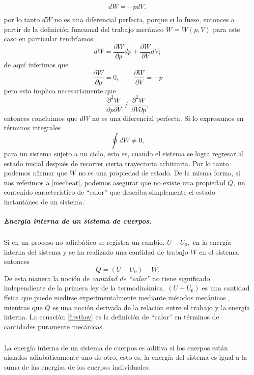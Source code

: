 \documentclass{article}
\theoremstyle{definition} \newtheorem{defi}{Definici\'on}
\theoremstyle{definition} \newtheorem{teo}{Teorema}
\theoremstyle{definition} \newtheorem{cor}{Corolario}
\begin{document}
\begin{align}
dW=-pdV,\\
\end{align}
por lo tanto $dW$ no es una diferencial perfecta, porque si lo fuese, entonces a partir de la definici\'on funcional del trabajo mec\'anico $W=W(p,V)$ para este caso en particular tendr\'iamos
\begin{equation}
dW = \frac{\partial W}{\partial p}dp + \frac{\partial W}{\partial V}dV;
\end{equation}
de aqu\'i inferimos que
\begin{equation}
\frac{\partial W}{\partial p}=0, \qquad \frac{\partial W}{\partial V} = -p
\end{equation}
pero esto implica necesariamente que
\begin{equation}
\frac{\partial^2 W}{\partial p\partial V}\neq\frac{\partial^2 W}{\partial V\partial p},
\end{equation}
entonces concluimos que $dW$ no es una diferencial perfecta. Si lo expresamos en t\'erminos integrales 
$$\oint dW \neq 0,$$
para un sistema sujeto a un ciclo, esto es, cuando el sistema se logra regresar al estado inicial despu\'es de recorrer cierta trayectoria arbitraria. Por lo tanto podemos afirmar que $W$ no es una propiedad de estado. De la misma forma, si nos referimos a \eqref{mecheat}, podemos asegurar que no existe una propiedad $Q$, un contenido caracter\'istico de ``calor'' que describa simplemente el estado instant\'aneo de un sistema.
\subparagraph{Energ\'ia interna de un sistema de cuerpos.}
Si en un proceso no adiab\'atico se registra un cambio, $U-U_0,$ en la energ\'ia interna del sistema y se ha realizado una cantidad de trabajo $W$ en el sistema, entonces 
\begin{equation}\label{firstlaw}
Q=(U-U_0)-W.
\end{equation}
De esta manera la noci\'on de \emph{cantidad de ``calor''} no tiene significado independiente de la primera ley de la termodin\'amica. $(U-U_0)$ es una cantidad f\'isica que puede medirse experimentalmente mediante m\'etodos mec\'anicos \cite{MB}, mientras que $Q$ es una noci\'on derivada de la relaci\'on entre el trabajo y la energ\'ia interna. La ecuaci\'on \eqref{firstlaw} es la definici\'on de ``calor'' en t\'erminos de cantidades puramente mec\'anicas.
\subparagraph{}
La energ\'ia interna de un sistema de cuerpos es aditiva si los cuerpos est\'an aislados adiab\'aticamente uno de otro, esto es, la energ\'ia del sistema es igual a la suma de las energ\'ias de los cuerpos individuales:
\end{document}
